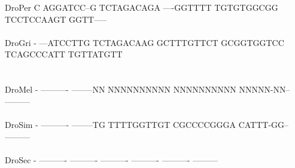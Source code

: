 \documentclass[11pt,twoside,reqno,a4paper]{article}
\begin{document}
{DroPer	C	AGGATCC--G	TCTAGACAGA	----GGTTTT	TGTGTGGCGG	TCCTCCAAGT	GGTT-----\\
\hspace*{7\charwidth}\hspace*{1\charwidth}\hspace*{1\charwidth}\hspace*{1\charwidth}\hspace*{1\charwidth}\hspace*{1\charwidth}\hspace*{1\charwidth}\\
DroGri	-	---ATCCTTG	TCTAGACAAG	GCTTTGTTCT	GCGGTGGTCC	TCAGCCCATT	TGTTATGTT\\
\hspace*{7\charwidth}\hspace*{1\charwidth}\hspace*{1\charwidth}\hspace*{1\charwidth}\hspace*{1\charwidth}\hspace*{1\charwidth}\hspace*{1\charwidth}\\
\\
DroMel	-	----------	--------NN	NNNNNNNNNN	NNNNNNNNNN	NNNNN-NN--	---------\\
\hspace*{7\charwidth}\hspace*{1\charwidth}\hspace*{1\charwidth}\hspace*{1\charwidth}\hspace*{1\charwidth}\hspace*{1\charwidth}\hspace*{1\charwidth}\\
DroSim	-	----------	--------TG	TTTTGGTTGT	CGCCCCGGGA	CATTT-GG--	---------\\
\hspace*{7\charwidth}\hspace*{1\charwidth}\hspace*{1\charwidth}\hspace*{1\charwidth}\hspace*{1\charwidth}\hspace*{1\charwidth}\hspace*{1\charwidth}\\
DroSec	-	----------	----------	----------	----------	----------	---------\\
\hspace*{7\charwidth}\hspace*{1\charwidth}\hspace*{1\charwidth}\hspace*{1\charwidth}\hspace*{1\charwidth}\hspace*{1\charwidth}\hspace*{1\charwidth}\\
}
\end{document}
